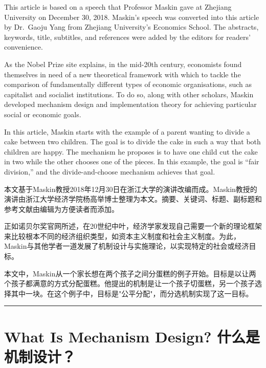 \documentclass[12pt,a4paper]{article}
\newenvironment{original}{%
  \par\vspace{4pt}\noindent%
  \color{black}%
  \ignorespaces
}{%
  \par\vspace{2pt}%
}
\newenvironment{translation}{%
  \par\vspace{2pt}\noindent%
  \color{transblue}%
  \ignorespaces
}{%
  \par\vspace{4pt}\hrule\vspace{6pt}%
}
\begin{document}
\begin{original}
This article is based on a speech that Professor Maskin gave at Zhejiang University on December 30, 2018. Maskin's speech was converted into this article by Dr.\ Gaoju Yang from Zhejiang University's Economics School. The abstracts, keywords, title, subtitles, and references were added by the editors for readers' convenience.

As the Nobel Prize site explains, in the mid-20th century, economists found themselves in need of a new theoretical framework with which to tackle the comparison of fundamentally different types of economic organisations, such as capitalist and socialist institutions. To do so, along with other scholars, Maskin developed mechanism design and implementation theory for achieving particular social or economic goals.

In this article, Maskin starts with the example of a parent wanting to divide a cake between two children. The goal is to divide the cake in such a way that both children are happy. The mechanism he proposes is to have one child cut the cake in two while the other chooses one of the pieces. In this example, the goal is ``fair division,'' and the divide-and-choose mechanism achieves that goal.
\end{original}
\begin{translation}
本文基于Maskin教授2018年12月30日在浙江大学的演讲改编而成。Maskin教授的演讲由浙江大学经济学院杨高举博士整理为本文。摘要、关键词、标题、副标题和参考文献由编辑为方便读者而添加。

正如诺贝尔奖官网所述，在20世纪中叶，经济学家发现自己需要一个新的理论框架来比较根本不同的经济组织类型，如资本主义制度和社会主义制度。为此，Maskin与其他学者一道发展了机制设计与实施理论，以实现特定的社会或经济目标。

本文中，Maskin从一个家长想在两个孩子之间分蛋糕的例子开始。目标是以让两个孩子都满意的方式分配蛋糕。他提出的机制是让一个孩子切蛋糕，另一个孩子选择其中一块。在这个例子中，目标是"公平分配"，而分选机制实现了这一目标。
\end{translation}

\section{What Is Mechanism Design? \hfill 什么是机制设计？}
\end{document}
